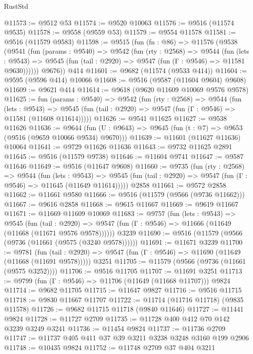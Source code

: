 \begin{lexlean}{RustStd}
\begin{coremodule}
@11573 := @9512 @53
@11574 := @9520 @10063
@11576 := @9516 (@11574 @9535)
@11578 := @9558 (@9559 @53)
@11579 := @9554 @11578
@11581 := @9516 (@11579 @9583)
@11598 := @9515
    (fun (fn : @86) =>
    @11576
      (@9538
        (@9541
          (fun (params : @9540) =>
          @9542
            (fun (rty : @2568) =>
            @9544
              (fun (lets : @9543) =>
              @9545 (fun (tail : @2920) => @9547 (fun (Γ : @9546) => @11581 @9630))))))
        @9676))
    @414
@11601 := @9682 (@11574 (@9533 @414))
@11604 := @9595 (@9596 @414) @10066
@11608 := @9516 (@9587 (@11604 @9604) @9608)
@11609 := @9621 @414
@11614 := @9618 (@9620 @11609 @10069 @9576 @9578)
@11625 := fun (params : @9540) =>
  @9542
    (fun (rty : @2568) =>
    @9544
      (fun (lets : @9543) =>
      @9545 (fun (tail : @2920) => @9547 (fun (Γ : @9546) => @11581 (@11608 @11614)))))
@11626 := @9541 @11625
@11627 := @9538 @11626
@11636 := @9644
    (fun (U : @9643) => @9645 (fun (t : @7) => @9653 (@9516 (@9659 @10066 @9534) @9670)))
@11639 := @11601 (@11627 @11636) @10064
@11641 := @9729 @11626 @11636
@11643 := @9732 @11625 @2891
@11645 := @9516 (@11579 @9738)
@11646 := @11604 @9741
@11647 := @9587 @11646
@11649 := @9516 (@11647 @9608)
@11660 := @9735
    (fun (rty : @2568) =>
    @9544
      (fun (lets : @9543) =>
      @9545 (fun (tail : @2920) => @9547 (fun (Γ : @9546) => @11645 (@11649 @11614)))))
    @2858
@11661 := @9572 @2858
@11662 := @11661 @9580
@11666 := @9516 (@11579 (@9566 (@9736 @11662)))
@11667 := @9616 @2858
@11668 := @9615 @11667
@11669 := @9619 @11667
@11671 := @11669 @11609 @10069
@11683 := @9757
    (fun (lets : @9543) =>
    @9545
      (fun (tail : @2920) =>
      @9547 (fun (Γ : @9546) => @11666 (@11649 (@11668 (@11671 @9576 @9578))))))
    @3239
@11690 := @9516 (@11579 (@9566 (@9736 (@11661 (@9575 (@3240 @9578))))))
@11691 := @11671 @3239
@11700 := @9781
    (fun (tail : @2920) => @9547 (fun (Γ : @9546) => @11690 (@11649 (@11668 (@11691 @9578)))))
    @3251
@11705 := @11579 (@9566 (@9736 (@11661 (@9575 @3252))))
@11706 := @9516 @11705
@11707 := @11691 @3251
@11713 := @9799 (fun (Γ : @9546) => @11706 (@11649 (@11668 @11707))) @9824
@11714 := @9682 @11705
@11715 := @11647 @9827
@11716 := @9516 @11715
@11718 := @9830 @11667 @11707
@11722 := @11714 (@11716 @11718) (@9835 @11578)
@11726 := @9682 @11715 @11718 (@9840 @11646)
@11727 := @11441 @9824
@11728 := @11727 @2709
@11735 := @11728 @400 @412 @70 @142 @3239 @3249 @3241
@11736 := @11454 @9824
@11737 := @11736 @2709
@11747 := @11737 @405 @411 @37 @39 @3211 @3238 @3248 @3160 @199 @2906
@11748 := @10435 @9824
@11752 := @11748 @2709 @37 @404 @3211

\end{coremodule}
\end{lexlean}
